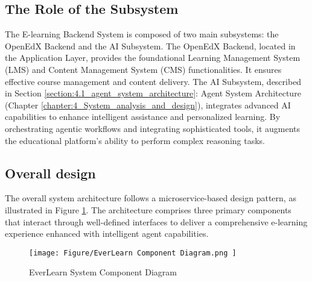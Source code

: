 \documentclass[../Main.tex]{subfiles}
\begin{document}
	\subsection{The Role of the Subsystem}
	\label{section:4.2.1_the_role_of_the_subsystem}
	\begin{condensed_idea}
		The E-learning Backend System is composed of two main subsystems: the OpenEdX Backend and the AI Subsystem. The OpenEdX Backend, located in the Application Layer, provides the foundational Learning Management System (LMS) and Content Management System (CMS) functionalities. It ensures
		effective course management and content delivery. The AI Subsystem,
		described in Section \ref{section:4.1_agent_system_architecture}: Agent System
		Architecture (Chapter \ref{chapter:4_System_analysis_and_design}),
		integrates advanced AI capabilities to enhance intelligent assistance and
		personalized learning. By orchestrating agentic workflows and integrating sophisticated
		tools, it augments the educational platform's ability to perform complex
		reasoning tasks.
	\end{condensed_idea}

	\subsection{Overall design}
	\label{section:4.2.1_overall_design}

	The overall system architecture follows a microservice-based design pattern, as
	illustrated in Figure \ref{fig:EverLearn_Component_Diagram}. The architecture
	comprises three primary components that interact through well-defined
	interfaces to deliver a comprehensive e-learning experience enhanced with
	intelligent agent capabilities.

	\begin{figure}[H]
		\centering
		\texttt{[image: 
			Figure/EverLearn Component Diagram.png
		]}
		\caption{EverLearn System Component Diagram}
		\label{fig:EverLearn_Component_Diagram}
	\end{figure}
\end{document}

